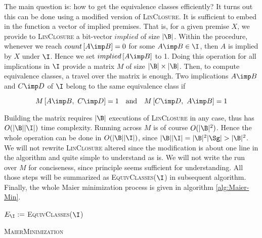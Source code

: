 \vspace{1.2em}

The main question is: how to get the equivalence classes efficiently? It turns
out this can be done using a modified version of \textsc{LinClosure}. It is 
sufficient to embed in the function a vector of implied premises. That is, 
for a given premise $X$, we provide to \textsc{LinClosure} a bit-vector 
$implied$ of size $|\B|$. Within the procedure, whenever we reach $count\left[A \imp B \right] = 0$ for some $A \imp B \in \I$, then $A$ is implied by $X$ under $\I$. Hence we set $implied\left[ A \imp B\right]$ to 1. Doing this operation for all implications in $\I$ provide a matrix $M$ of size $|\B| \times |\B|$. Then, to compute equivalence classes, a travel over the matrix is enough. Two implications $A \imp B$ and $C \imp D$ of $\I$ belong to the same equivalence class if 

\[ M\left[A \imp B, \ C \imp D \right] = 1 \quad \text{and} \quad 
M\left[C \imp D, \ A \imp B \right] = 1 \]

\noindent Building the matrix requires $|\B|$ executions of \textsc{LinClosure}
in any case, thus has $O(|\B||\I|)$ time complexity. Running across $M$ is 
of course $O(|\B|^2)$. Hence the whole operation can be done in $O(|\B||\I|)$,
since $|\B||\I| = |\B|^2|\Sg| > |\B|^2$. We will not rewrite 
\textsc{LinClosure} altered since the modification is about one line in the 
algorithm and quite simple to understand as is. We will not write the run over 
$M$ for conciseness, since principle seems sufficient for understanding. All 
those steps will be summarized as \textsc{EquivClasses}($\I$) in subsequent 
algorithm. Finally, the whole Maier minimization process is given in algorithm
\ref{alg:Maier-Min}.

\vspace{1.2em}

\begin{algorithm}
	
	\BlankLine
	\BlankLine
	
	
	\BlankLine
	
	$E_{\I} := $ \textsc{EquivClasses}($\I$) \;
	
	\BlankLine
	
	
	\caption{\textsc{MaierMinimization}}
	\label{alg:Maier-Min}
\end{algorithm}

